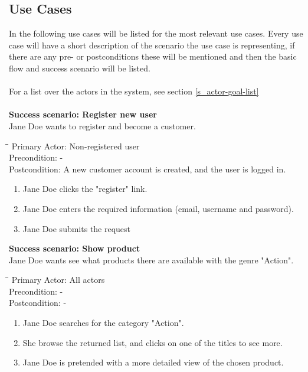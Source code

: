 \subsection{Use Cases}
In the following use cases will be listed for the most relevant use cases. Every use case will have a short description of the scenario the use case is representing, if there are any pre- or postconditions these will be mentioned and then the basic flow and success scenario will be listed.
\\
\\
For a list over the actors in the system, see section \ref{s_actor-goal-list}
\\
\\
\textbf{Success scenario: Register new user} \\
Jane Doe wants to register and become a customer. 
\begin{tabbing}
\hspace{5mm}\=\hspace{28mm}\=\kill
\>Primary Actor:\> Non-registered user\\
\>Precondition:\> -\\
\>Postcondition:\> A new customer account is created, and the user is logged in.
\end{tabbing}
\begin{enumerate} \setlength{\itemsep}{-1mm}
	\item Jane Doe clicks the "register" link.
	\item Jane Doe enters the required information (email, username and password).
	\item Jane Doe submits the request
\end{enumerate}
\vspace{3mm}
\textbf{Success scenario: Show product} \\
Jane Doe wants see what products there are available with the genre "Action".
\begin{tabbing}
\hspace{5mm}\=\hspace{26mm}\=\kill
\>Primary Actor:\> All actors\\
\>Precondition:\> -\\
\>Postcondition:\> -
\end{tabbing}
\begin{enumerate} \setlength{\itemsep}{-1mm}
	\item Jane Doe searches for the category "Action".
	\item She browse the returned list, and clicks on one of the titles to see more.
	\item Jane Doe is pretended with a more detailed view of the chosen product.
\end{enumerate}

